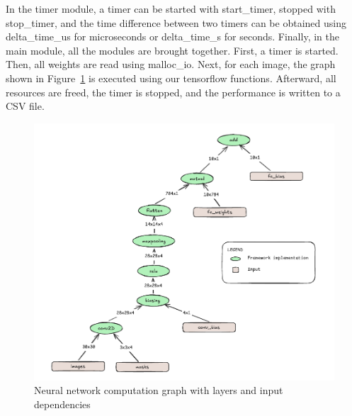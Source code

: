 \documentclass[modern,longauthor]{aastex7}
\begin{document}
In the timer module, a timer can be started with start\_timer, stopped with stop\_timer, and the time difference between two timers can be obtained using delta\_time\_us for microseconds or delta\_time\_s for seconds. Finally, in the main module, all the modules are brought together. First, a timer is started. Then, all weights are read using malloc\_io. Next, for each image, the graph shown in Figure~\ref{fig:graph} is executed using our tensorflow functions. Afterward, all resources are freed, the timer is stopped, and the performance is written to a CSV file.
\begin{figure}[htb!]
    \centering
    \includegraphics[width=\linewidth]{Naive/Graph.png}
    \caption{Neural network computation graph with layers and input dependencies}
   \label{fig:graph}
\end{figure}
\end{document}
